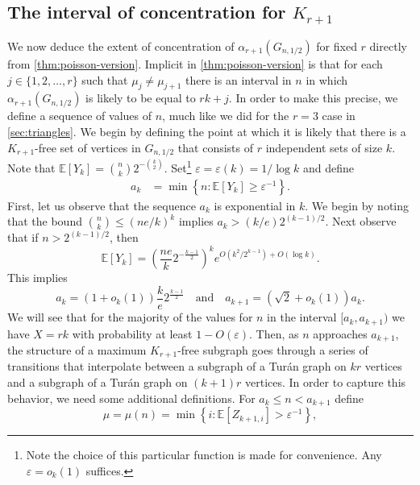 \documentclass[11pt]{article}
\theoremstyle{definition}
\theoremstyle{remark}
\renewcommand{\epsilon}{\varepsilon}
\newcommand{\EE}{\mathbb{E}}
\newcommand{\E}{\mathbb{E}}
\begin{document}
\subsection{The interval of concentration for \texorpdfstring{$K_{r+1}$}{Kr+1}} \label{sec:intervals}
We now deduce the extent of concentration of $ \alpha_{r+1}( G_{n,1/2})$ for fixed $r$
directly from \cref{thm:poisson-version}.  Implicit in \cref{thm:poisson-version} is that  for each $j \in \{1,2, \dots, r\}$ such that $ \mu_j \neq \mu_{j+1}$ there is an interval in $n$ in which $ \alpha_{r+1}(G_{n,1/2})$ is likely 
to be equal to $ rk + j$.
In order to make this precise, we 
define a sequence of values of $n$, much like we did for the $r = 3$ case in \cref{sec:triangles}.  
We begin by defining the point at
which it is likely that there is a $K_{r+1}$-free set of vertices in $G_{n,1/2}$ that consists of $r$ independent sets of size $k$. Note that $\EE[Y_k]={\binom{n}{k}}2^{-{\binom{k}{2}}}$.
Set\footnote{Note the choice of this particular function is made for
convenience. Any $ \epsilon = o_k(1)$ suffices.} $ \epsilon = \epsilon(k) = 1/\log k $  
and define
%
\begin{align*}
a_k &=\min \left\{ n : \EE [Y_k] \ge \epsilon^{-1} \right\}.
 \end{align*}
First, let us observe that 
the sequence $a_k$ is exponential in $k$. We begin by noting that the bound $ \binom{n}{k} \le ( ne/k)^k$ implies $ a_k > (k/e)2^{(k-1)/2}$. Next observe that if $n > 2^{(k-1)/2}$,  then 
\[ \E[Y_k] = \left( \frac{ne}{k} 2^{ - \frac{k-1}{2}}\right)^k e^{O(k^2/2^{k-1}) + O( \log k )}.\] 
This implies
\[
a_k = (1 +o_k(1)) \frac{k}{e} 2^{\frac{k-1}{2}} \ \ \
\text{ and } \ \ \  
a_{k+1} = ( \sqrt{2} + o_k(1)) a_k.\]
%
We will see that for the majority of the values for $n$ in the interval $[a_k, a_{k+1})$ we have $X=rk$ with probability
at least $1 - O(\epsilon) $. Then, as $n$ approaches $a_{k+1}$, the structure of a maximum $K_{r+1}$-free subgraph goes through a series of transitions that interpolate between a subgraph of a Tur\'an graph on $kr$ vertices and a subgraph of 
a Tur\'an graph on $ (k+1)r$ vertices. In order to capture this behavior, 
we need some additional definitions. For $ a_k \le n < a_{k+1}$ define
\[ \mu = \mu(n) = \min \left\{i : \EE [Z_{k+1,i} ] > \epsilon^{-1} \right\},\]
\end{document}
